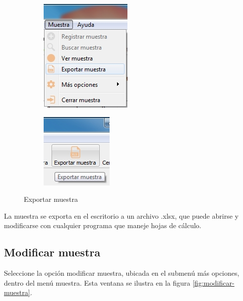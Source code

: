 \begin{figure}[H]
\centering
\begin{subfigure}{.5\textwidth}
  \centering
  \includegraphics[width=.6\linewidth]{./img/exportar-menu.jpg}
\end{subfigure}%
\begin{subfigure}{.5\textwidth}
  \centering
  \includegraphics[width=.45\linewidth]{./img/exportar-barra.jpg}
\end{subfigure}
\caption[]{Exportar muestra\label{fig:exportar-muestra}}
\end{figure}

	La muestra se exporta en el escritorio a un archivo .xlsx, que puede abrirse y modificarse con cualquier programa que maneje hojas de c\'{a}lculo.

	\subsection*{Modificar muestra}
	
	Seleccione la opci\'{o}n modificar muestra, ubicada en el submen\'{u} m\'{a}s opciones, dentro del men\'{u} muestra. Esta ventana se ilustra en la figura \ref{fig:modificar-muestra}.
\newpage
